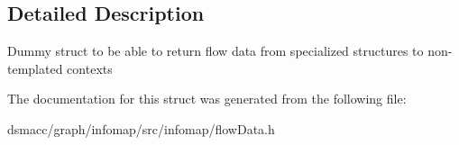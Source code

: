 \subsection{Detailed Description}
Dummy struct to be able to return flow data from specialized structures to non-\/templated contexts 

The documentation for this struct was generated from the following file\+:\begin{DoxyCompactItemize}
\item 
dsmacc/graph/infomap/src/infomap/flow\+Data.\+h\end{DoxyCompactItemize}
